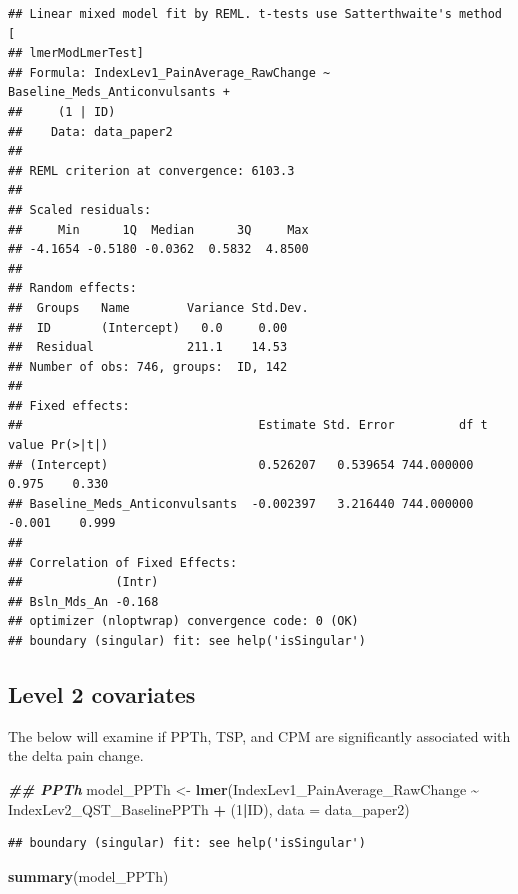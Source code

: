 \documentclass[
  12pt,
]{article}
\newenvironment{Shaded}{\begin{snugshade}}{\end{snugshade}}
\newcommand{\AttributeTok}[1]{\textcolor[rgb]{0.13,0.29,0.53}{#1}}
\newcommand{\DecValTok}[1]{\textcolor[rgb]{0.00,0.00,0.81}{#1}}
\newcommand{\DocumentationTok}[1]{\textcolor[rgb]{0.56,0.35,0.01}{\textbf{\textit{#1}}}}
\newcommand{\FunctionTok}[1]{\textcolor[rgb]{0.13,0.29,0.53}{\textbf{#1}}}
\newcommand{\NormalTok}[1]{#1}
\newcommand{\OtherTok}[1]{\textcolor[rgb]{0.56,0.35,0.01}{#1}}
\newcommand{\SpecialCharTok}[1]{\textcolor[rgb]{0.81,0.36,0.00}{\textbf{#1}}}
\begin{document}
\begin{verbatim}
## Linear mixed model fit by REML. t-tests use Satterthwaite's method [
## lmerModLmerTest]
## Formula: IndexLev1_PainAverage_RawChange ~ Baseline_Meds_Anticonvulsants +  
##     (1 | ID)
##    Data: data_paper2
## 
## REML criterion at convergence: 6103.3
## 
## Scaled residuals: 
##     Min      1Q  Median      3Q     Max 
## -4.1654 -0.5180 -0.0362  0.5832  4.8500 
## 
## Random effects:
##  Groups   Name        Variance Std.Dev.
##  ID       (Intercept)   0.0     0.00   
##  Residual             211.1    14.53   
## Number of obs: 746, groups:  ID, 142
## 
## Fixed effects:
##                                 Estimate Std. Error         df t value Pr(>|t|)
## (Intercept)                     0.526207   0.539654 744.000000   0.975    0.330
## Baseline_Meds_Anticonvulsants  -0.002397   3.216440 744.000000  -0.001    0.999
## 
## Correlation of Fixed Effects:
##             (Intr)
## Bsln_Mds_An -0.168
## optimizer (nloptwrap) convergence code: 0 (OK)
## boundary (singular) fit: see help('isSingular')
\end{verbatim}

\hypertarget{level-2-covariates}{%
\subsection{Level 2 covariates}\label{level-2-covariates}}

The below will examine if PPTh, TSP, and CPM are significantly
associated with the delta pain change.

\begin{Shaded}
\begin{Highlighting}[]
\DocumentationTok{\#\# PPTh}
\NormalTok{model\_PPTh }\OtherTok{\textless{}{-}} \FunctionTok{lmer}\NormalTok{(IndexLev1\_PainAverage\_RawChange }\SpecialCharTok{\textasciitilde{}}\NormalTok{ IndexLev2\_QST\_BaselinePPTh }\SpecialCharTok{+}\NormalTok{ (}\DecValTok{1}\SpecialCharTok{|}\NormalTok{ID), }\AttributeTok{data =}\NormalTok{ data\_paper2)}
\end{Highlighting}
\end{Shaded}

\begin{verbatim}
## boundary (singular) fit: see help('isSingular')
\end{verbatim}

\begin{Shaded}
\begin{Highlighting}[]
\FunctionTok{summary}\NormalTok{(model\_PPTh)}
\end{Highlighting}
\end{Shaded}
\end{document}

